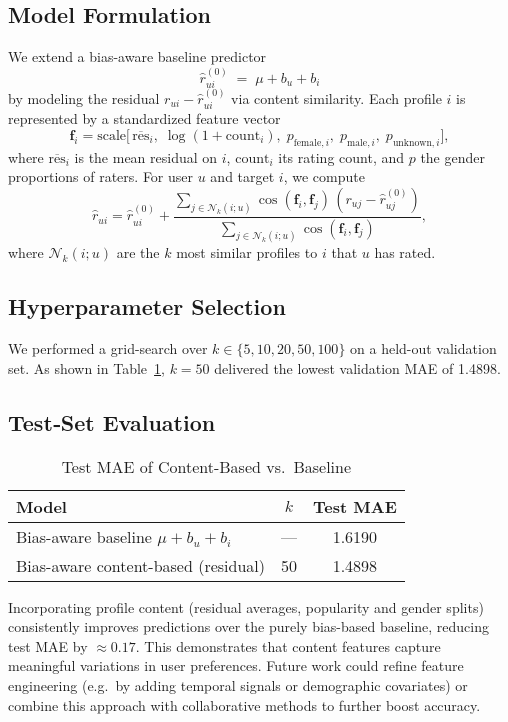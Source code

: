 \subsection*{Model Formulation}
We extend a bias-aware baseline predictor 
\[
  \hat r_{ui}^{(0)} \;=\; \mu + b_u + b_i
\]
by modeling the residual \(r_{ui} - \hat r_{ui}^{(0)}\) via content similarity.  Each profile \(i\) is represented by a standardized feature vector 
\[
  \mathbf{f}_i = \mathrm{scale}\bigl[\,
    \overline{\mathrm{res}}_i,\;
    \log(1 + \mathrm{count}_i),\;
    p_{\mathrm{female},i},\;
    p_{\mathrm{male},i},\;
    p_{\mathrm{unknown},i}
  \bigr],
\]
where \(\overline{\mathrm{res}}_i\) is the mean residual on \(i\), \(\mathrm{count}_i\) its rating count, and \(p\) the gender proportions of raters.  For user \(u\) and target \(i\), we compute
\[
  \hat r_{ui}
  = \hat r_{ui}^{(0)}
  + \frac{\sum_{j\in\mathcal N_k(i;u)} 
               \cos(\mathbf f_i,\mathbf f_j)\,(r_{uj} - \hat r_{uj}^{(0)})}
         {\sum_{j\in\mathcal N_k(i;u)} \cos(\mathbf f_i,\mathbf f_j)},
\]
where \(\mathcal N_k(i;u)\) are the \(k\) most similar profiles to \(i\) that \(u\) has rated.

\subsection*{Hyperparameter Selection}
We performed a grid-search over \(k\in\{5,10,20,50,100\}\) on a held-out validation set.  As shown in Table~\ref{tab:cbf}, \(k=50\) delivered the lowest validation MAE of 1.4898.

\subsection*{Test‐Set Evaluation}
\begin{table}[H]
  \centering
  \caption{Test MAE of Content-Based vs.\ Baseline}
  \label{tab:cbf}
  \begin{tabular}{@{}lcc@{}}
    \toprule
    Model                            & \(k\) & Test MAE \\ 
    \midrule
    Bias-aware baseline \(\mu+b_u+b_i\)     & —     & 1.6190   \\
    Bias-aware content-based (residual)     & 50    & 1.4898   \\
    
    \bottomrule
  \end{tabular}
\end{table}

Incorporating profile content (residual averages, popularity and gender splits) consistently improves predictions over the purely bias-based baseline, reducing test MAE by \(\approx\!0.17\).  This demonstrates that content features capture meaningful variations in user preferences.  Future work could refine feature engineering (e.g.\ by adding temporal signals or demographic covariates) or combine this approach with collaborative methods to further boost accuracy.